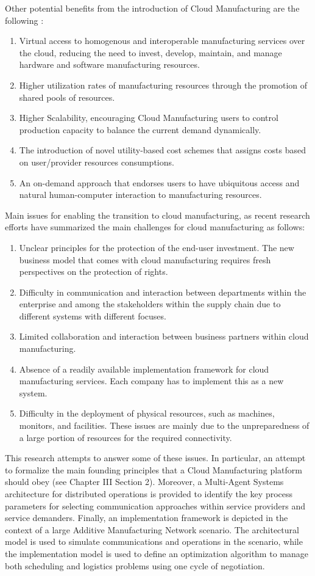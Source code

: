 Other potential benefits from the introduction of Cloud Manufacturing are the following \parencite{ren_cloud_2017}:
\begin{enumerate}
    \item Virtual access to homogenous and interoperable manufacturing services over the cloud, reducing the need to invest, develop, maintain, and manage hardware and software manufacturing resources.
    \item Higher utilization rates of manufacturing resources through the promotion of shared pools of resources.
    \item Higher Scalability, encouraging Cloud Manufacturing users to control production capacity to balance the current demand dynamically.
    \item The introduction of novel utility-based cost schemes that assigns costs based on user/provider resources consumptions.
    \item An on-demand approach that endorses users to have ubiquitous access and natural human-computer interaction to manufacturing resources.
\end{enumerate}
Main issues for enabling the transition to cloud manufacturing, as recent research efforts have summarized the main challenges for cloud manufacturing as follows:
\begin{enumerate}
    \item Unclear principles for the protection of the end-user investment. The new business model that comes with cloud manufacturing requires fresh perspectives on the protection of rights.
    \item Difficulty in communication and interaction between departments within the enterprise and among the stakeholders within the supply chain due to different systems with different focuses.
    \item Limited collaboration and interaction between business partners within cloud manufacturing.
    \item Absence of a readily available implementation framework for cloud manufacturing services. Each company has to implement this as a new system.
    \item Difficulty in the deployment of physical resources, such as machines, monitors, and facilities. These issues are mainly due to the unpreparedness of a large portion of resources for the required connectivity.
\end{enumerate}
This research attempts to answer some of these issues. In particular, an attempt to formalize the main founding principles that a Cloud Manufacturing platform should obey (see Chapter III Section 2). Moreover, a Multi-Agent Systems architecture for distributed operations is provided to identify the key process parameters for selecting communication approaches within service providers and service demanders. Finally, an implementation framework is depicted in the context of a large Additive Manufacturing Network scenario. The architectural model is used to simulate communications and operations in the scenario, while the implementation model is used to define an optimization algorithm to manage both scheduling and logistics problems using one cycle of negotiation.
